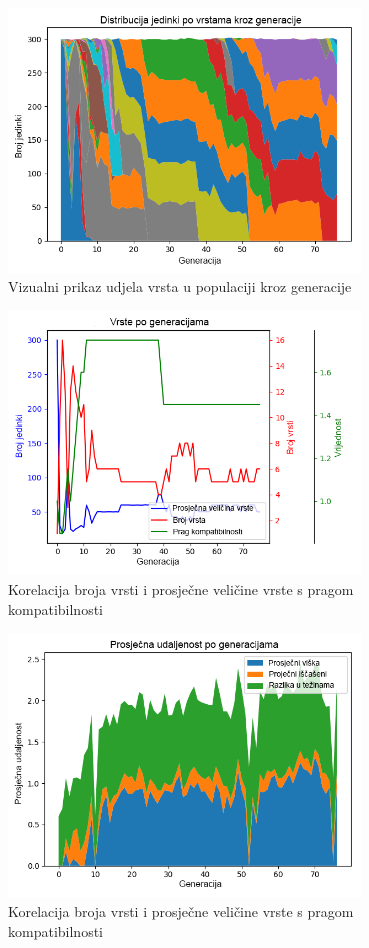 \documentclass[times, utf8, diplomski, numeric]{fer}
\begin{document}
\begin{figure}
  \centering
  \includegraphics[height=7cm]{slika17}
  \caption{Vizualni prikaz udjela vrsta u populaciji kroz generacije}
  \label{slika17}
\end{figure}

\begin{figure}
  \centering
  \includegraphics[height=7cm]{slika18}
  \caption{Korelacija broja vrsti i prosječne veličine vrste s pragom kompatibilnosti}
  \label{slika18}
\end{figure}

\begin{figure}
  \centering
  \includegraphics[height=7cm]{slika19}
  \caption{Korelacija broja vrsti i prosječne veličine vrste s pragom kompatibilnosti}
  \label{slika19}
\end{figure}
\end{document}
